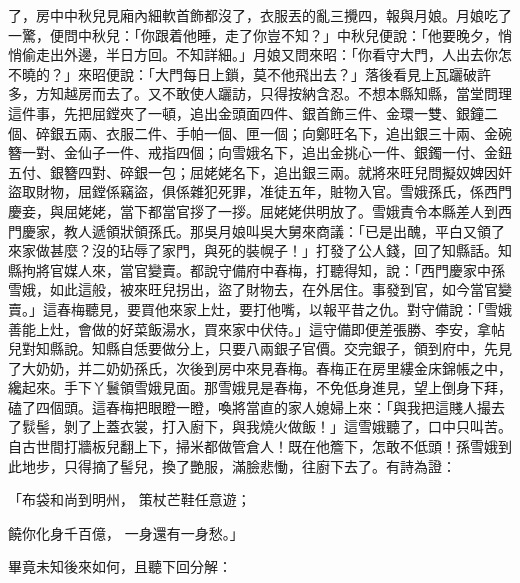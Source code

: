 \begin{showcontents}{}
了，房中中秋兒見廂內細軟首飾都沒了，衣服丟的亂三攪四，報與月娘。月娘吃了一驚，便問中秋兒：「你跟着他睡，走了你豈不知？」中秋兒便說：「他要晚夕，悄悄偷走出外邊，半日方回。不知詳細。」月娘又問來昭：「你看守大門，人出去你怎不曉的？」來昭便說：「大門每日上鎖，莫不他飛出去？」落後看見上瓦躧破許多，方知越房而去了。又不敢使人躧訪，只得按納含忍。不想本縣知縣，當堂問理這件事，先把屈鏜夾了一頓，追出金頭面四件、銀首飾三件、金環一雙、銀鐘二個、碎銀五兩、衣服二件、手帕一個、匣一個；向鄭旺名下，追出銀三十兩、金碗簪一對、金仙子一件、戒指四個；向雪娥名下，追出金挑心一件、銀鐲一付、金鈕五付、銀簪四對、碎銀一包；屈姥姥名下，追出銀三兩。就將來旺兒問擬奴婢因奸盜取財物，屈鏜係竊盜，俱係雜犯死罪，准徒五年，賍物入官。雪娥孫氏，係西門慶妾，與屈姥姥，當下都當官拶了一拶。屈姥姥供明放了。雪娥責令本縣差人到西門慶家，教人遞領狀領孫氏。那吳月娘叫吳大舅來商議：「已是出醜，平白又領了來家做甚麼？沒的玷辱了家門，與死的裝幌子！」打發了公人錢，回了知縣話。知縣拘將官媒人來，當官變賣。都說守備府中春梅，打聽得知，說：「西門慶家中孫雪娥，如此這般，被來旺兒拐出，盜了財物去，在外居住。事發到官，如今當官變賣。」這春梅聽見，要買他來家上灶，要打他嘴，以報平昔之仇。對守備說：「雪娥善能上灶，會做的好菜飯湯水，買來家中伏侍。」這守備即便差張勝、李安，拿帖兒對知縣說。知縣自恁要做分上，只要八兩銀子官價。交完銀子，領到府中，先見了大奶奶，并二奶奶孫氏，次後到房中來見春梅。春梅正在房里縷金床錦帳之中，纔起來。手下丫鬟領雪娥見面。那雪娥見是春梅，不免低身進見，望上倒身下拜，磕了四個頭。這春梅把眼瞪一瞪，喚將當直的家人媳婦上來：「與我把這賤人撮去了䯼髻，剝了上蓋衣裳，打入廚下，與我燒火做飯！」這雪娥聽了，口中只叫苦。自古世間打牆板兒翻上下，掃米都做管倉人！既在他簷下，怎敢不低頭！孫雪娥到此地步，只得摘了髻兒，換了艷服，滿臉悲慟，往廚下去了。有詩為證：

「布袋和尚到明州，  策杖芒鞋任意遊；

饒你化身千百億，  一身還有一身愁。」

畢竟未知後來如何，且聽下回分解：





\end{showcontents}


